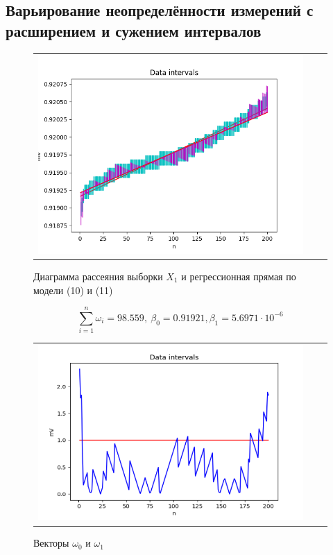 \documentclass[a4paper,14pt]{article}
\begin{document}
	\subsection{Варьирование неопределённости измерений с расширением и сужением интервалов}
	\begin{figure}[H]
		\begin{center}
			\begin{tabular}{ccc}
				\includegraphics[scale=0.7]{../image/data_and_intervals3.png}
			\end{tabular}
		\end{center}
		\caption{Диаграмма рассеяния выборки $X_1$ и регрессионная прямая по модели (10) и (11)} 
	\end{figure}

	\begin{equation*}
		\sum\limits_{i=1}^n \omega_i = 98.559 ,\ \beta_0 = 0.91921, \beta_1 = 5.6971 \cdot 10^{-6}
	\end{equation*}

	\begin{figure}[H]
		\begin{center}
			\begin{tabular}{ccc}
				\includegraphics[scale=0.7]{../image/data4.png}
			\end{tabular}
		\end{center}
		\caption{Векторы $\omega_0$ и $\omega_1$} 
	\end{figure}
	
\end{document}
